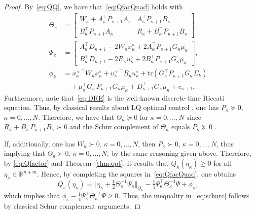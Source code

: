 \documentclass[10pt]{IEEEtran}      %
\newcommand{\R}{\mathbb{R}}
\newcommand{\tr}{\mathrm{tr}}
\theoremstyle{theorem}
\theoremstyle{remark}
\begin{document}
\begin{proof}
By~\eqref{eq:QQ}, we have that~\eqref{eq:QfacQuad} holds with
\begin{subequations}
\label{eq:QMatr}%
\begin{align}
\Theta_\kappa & = \left[\begin{array}{cc}
W_{\kappa} +A_\kappa^\top P_{\kappa+1} A_\kappa & A_\kappa^\top P_{\kappa+1} B_\kappa\\
B_\kappa^\top P_{\kappa+1} A_\kappa & R_\kappa+B_\kappa^\top P_{\kappa+1} B_\kappa
\end{array}\right],\label{eq:theta}\\
\Psi_\kappa &= \left[\begin{array}{c}
A_\kappa^\top D_{\kappa+1} - 2 W_\kappa x_\kappa^{\diamond}+2A_\kappa^\top P_{\kappa+1} G_\kappa \mu_\kappa\\
B_\kappa^\top  D_{\kappa+1}-2 R_\kappa u_\kappa^\diamond +2 B_\kappa^\top P_{\kappa+1}G_\kappa \mu_\kappa
\end{array}\right],\\
\nonumber \phi_k & = x_\kappa^{\diamond\,\top} W_\kappa x_\kappa^{\diamond}+u_\kappa^{\diamond\,\top} R_\kappa u_\kappa^\diamond+\tr( G_\kappa^\top P_{\kappa+1}G_\kappa \Sigma_k)\\
&\quad+\mu_\kappa^\top G_\kappa^\top P_{\kappa+1}G_\kappa \mu_\kappa +D_{\kappa+1}^\top G_\kappa \mu_\kappa+ c_{\kappa+1}.
\end{align}
\end{subequations}
Furthermore, note that~\eqref{eq:DRE} is the well-known discrete-time Riccati equation. Thus,
by classical results about LQ optimal control \cite{anderson2007optimal,dorato1985optimal},
one has $P_\kappa \succeq 0$, $\kappa=0,\dots,N$. 
Therefore, we have that $\Theta_\kappa\succeq 0$ for $\kappa=0,\dots,N$
since $ R_\kappa+B_\kappa^\top P_{\kappa+1} B_\kappa \succ 0$ and the Schur complement 
of $\Theta_\kappa$ equals $P_\kappa\succeq 0$ \cite{zhang2006schur}.

If, additionally, one has $W_\kappa \succ 0$, $\kappa=0,\dots,N$, then $P_\kappa\succ 0$, $\kappa=0,\dots,N$,
thus implying that $\Theta_\kappa\succ 0$, $\kappa=0,\dots,N$, by the same reasoning given above.
Therefore, by \eqref{eq:Qfactor} and Theorem~\ref{thm:opt}, 
it results that $Q_\kappa(\eta_{\kappa})\geq 0$ for all $\eta_{\kappa}\in\R^{n+m}$. Hence, by completing the
squares in~\eqref{eq:QfacQuad}, one obtains
\begin{equation*}
Q_\kappa(\eta_\kappa) = \Vert \eta_{\kappa}+\tfrac{1}{2} \Theta_{\kappa}^{-1}\Psi_{\kappa} \Vert_{\Theta_{\kappa}}
-\tfrac{1}{4}\Psi_{\kappa}^\top\Theta_{\kappa}^{-1}\Psi + \phi_{\kappa},
\end{equation*}
which implies that $\phi_{\kappa}-\tfrac{1}{4}\Psi_{\kappa}^\top\Theta_{\kappa}^{-1}\Psi\geq 0$. Thus, the inequality
in~\eqref{eq:schurc} follows by classical Schur complement arguments.
\end{proof}
\end{document}
